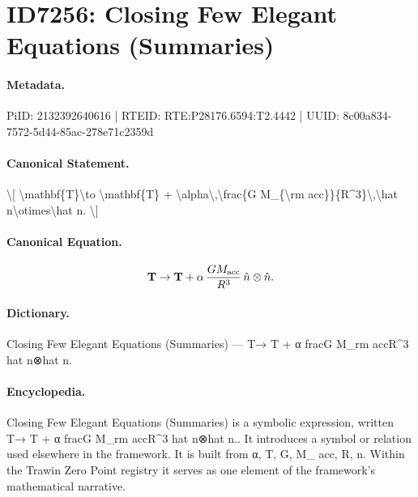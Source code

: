 \section*{ID7256: Closing Few Elegant Equations (Summaries)}
\paragraph{Metadata.}
PiID: 2132392640616 | RTEID: RTE:P28176.6594:T2.4442 | UUID: 8c00a834-7572-5d44-85ac-278e71c2359d

\paragraph{Canonical Statement.}
\textbackslash{}[ \textbackslash{}mathbf\{T\}\textbackslash{}to \textbackslash{}mathbf\{T\} + \textbackslash{}alpha\textbackslash{},\textbackslash{}frac\{G M\_\{\textbackslash{}rm acc\}\}\{R\textasciicircum{}3\}\textbackslash{},\textbackslash{}hat n\textbackslash{}otimes\textbackslash{}hat n. \textbackslash{}]

\paragraph{Canonical Equation.}
\[
\mathbf{T}\to \mathbf{T} + \alpha\,\frac{G M_{\rm acc}}{R^3}\,\hat n\otimes\hat n.
\]

\paragraph{Dictionary.}
Closing Few Elegant Equations (Summaries) — T→ T + α fracG M\_rm accR\textasciicircum{}3 hat n⊗hat n.

\paragraph{Encyclopedia.}
Closing Few Elegant Equations (Summaries) is a symbolic expression, written T→ T + α fracG M\_rm accR\textasciicircum{}3 hat n⊗hat n.. It introduces a symbol or relation used elsewhere in the framework. It is built from α, T, G, M\_ acc, R, n. Within the Trawin Zero Point registry it serves as one element of the framework's mathematical narrative.

